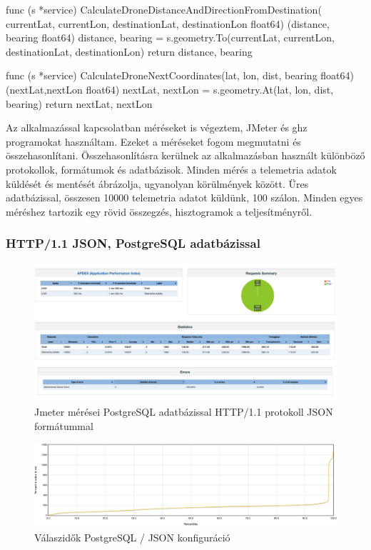 \begin{python}
    func (s *service) CalculateDroneDistanceAndDirectionFromDestination(
    currentLat, currentLon, destinationLat, destinationLon float64)
    (distance, bearing float64) {
        distance, bearing = s.geometry.To(currentLat,
        currentLon, destinationLat, destinationLon)
        return distance, bearing
    }

    func (s *service) CalculateDroneNextCoordinates(lat, lon,
    dist, bearing float64) (nextLat,nextLon float64) {
        nextLat, nextLon = s.geometry.At(lat, lon, dist, bearing)
        return nextLat, nextLon
    }
\end{python}


Az alkalmazással kapcsolatban méréseket is végeztem, JMeter\cite{apache}  és ghz\cite{ghz} programokat használtam.
Ezeket a méréseket fogom megmutatni és összehasonlítani.
Összehasonlításra kerülnek az alkalmazásban használt különböző protokollok, formátumok és adatbázisok.
Minden mérés a telemetria adatok küldését és mentését ábrázolja, ugyanolyan körülmények között.
Üres adatbázissal, összesen 10000 telemetria adatot küldünk, 100 szálon.
Minden egyes méréshez tartozik egy rövid összegzés, hisztogramok a teljesítményről.

\subsubsection{HTTP/1.1 JSON, PostgreSQL adatbázissal}
\begin{figure}[hbt!]
    \centering
    \includegraphics[scale=0.2]{images/jmeter-json-postgres}
    \caption{Jmeter mérései PostgreSQL adatbázissal HTTP/1.1 protokoll JSON formátummal}
    \label{fig:jmeter-json-postgres}
\end{figure}

\begin{figure}[hbt!]
    \centering
    \includegraphics[scale=0.3]{images/json-postgres-response-times}
    \caption{Válaszidők PostgreSQL / JSON konfiguráció}
    \label{fig:json-postgres-response-times}
\end{figure}

